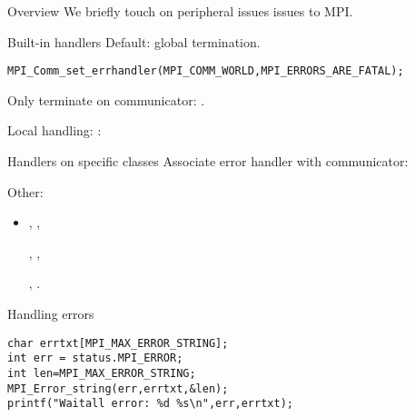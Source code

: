 
\begin{numberedframe}{Overview}
  We briefly touch on peripheral issues issues to MPI.
\end{numberedframe}


\begin{numberedframe}{Built-in handlers}
  \label{sl:errhandler}
Default: global termination.
\begin{lstlisting}
MPI_Comm_set_errhandler(MPI_COMM_WORLD,MPI_ERRORS_ARE_FATAL);
\end{lstlisting}

\begin{mpifour}
  Only terminate on communicator: .
\end{mpifour}
  
Local handling: :
\end{numberedframe}

\begin{numberedframe}{Handlers on specific classes}
Associate error handler with communicator:\\
   

  Other:
\begin{itemize}
\item  {},
  ,
\begin{mpifour}
  ,
  ,
\end{mpifour}
  ,
  .
\end{itemize}  
\end{numberedframe}

\begin{numberedframe}{Handling errors}
\begin{lstlisting}
char errtxt[MPI_MAX_ERROR_STRING];
int err = status.MPI_ERROR;
int len=MPI_MAX_ERROR_STRING;
MPI_Error_string(err,errtxt,&len);
printf("Waitall error: %d %s\n",err,errtxt);    
\end{lstlisting}
\end{numberedframe}

